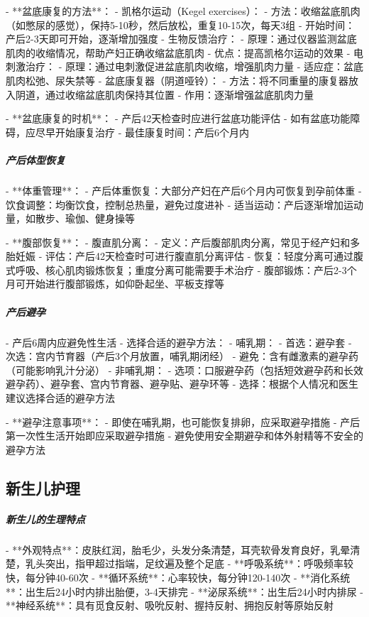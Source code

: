 \begin{enumerate}
- **盆底康复的方法**：
  - 凯格尔运动（Kegel exercises）：
    - 方法：收缩盆底肌肉（如憋尿的感觉），保持5-10秒，然后放松，重复10-15次，每天3组
    - 开始时间：产后2-3天即可开始，逐渐增加强度
  - 生物反馈治疗：
    - 原理：通过仪器监测盆底肌肉的收缩情况，帮助产妇正确收缩盆底肌肉
    - 优点：提高凯格尔运动的效果
  - 电刺激治疗：
    - 原理：通过电刺激促进盆底肌肉收缩，增强肌肉力量
    - 适应症：盆底肌肉松弛、尿失禁等
  - 盆底康复器（阴道哑铃）：
    - 方法：将不同重量的康复器放入阴道，通过收缩盆底肌肉保持其位置
    - 作用：逐渐增强盆底肌肉力量

- **盆底康复的时机**：
  - 产后42天检查时应进行盆底功能评估
  - 如有盆底功能障碍，应尽早开始康复治疗
  - 最佳康复时间：产后6个月内

\subparagraph{产后体型恢复}

- **体重管理**：
  - 产后体重恢复：大部分产妇在产后6个月内可恢复到孕前体重
  - 饮食调整：均衡饮食，控制总热量，避免过度进补
  - 适当运动：产后逐渐增加运动量，如散步、瑜伽、健身操等

- **腹部恢复**：
  - 腹直肌分离：
    - 定义：产后腹部肌肉分离，常见于经产妇和多胎妊娠
    - 评估：产后42天检查时可进行腹直肌分离评估
    - 恢复：轻度分离可通过腹式呼吸、核心肌肉锻炼恢复；重度分离可能需要手术治疗
  - 腹部锻炼：产后2-3个月可开始进行腹部锻炼，如仰卧起坐、平板支撑等

\subparagraph{产后避孕}

- 产后6周内应避免性生活
- 选择合适的避孕方法：
  - 哺乳期：
    - 首选：避孕套
    - 次选：宫内节育器（产后3个月放置，哺乳期闭经）
    - 避免：含有雌激素的避孕药（可能影响乳汁分泌）
  - 非哺乳期：
    - 选项：口服避孕药（包括短效避孕药和长效避孕药）、避孕套、宫内节育器、避孕贴、避孕环等
    - 选择：根据个人情况和医生建议选择合适的避孕方法

- **避孕注意事项**：
  - 即使在哺乳期，也可能恢复排卵，应采取避孕措施
  - 产后第一次性生活开始即应采取避孕措施
  - 避免使用安全期避孕和体外射精等不安全的避孕方法

\subsection{新生儿护理}

\subparagraph{新生儿的生理特点}

- **外观特点**：皮肤红润，胎毛少，头发分条清楚，耳壳软骨发育良好，乳晕清楚，乳头突出，指甲超过指端，足纹遍及整个足底
- **呼吸系统**：呼吸频率较快，每分钟40-60次
- **循环系统**：心率较快，每分钟120-140次
- **消化系统**：出生后24小时内排出胎便，3-4天排完
- **泌尿系统**：出生后24小时内排尿
- **神经系统**：具有觅食反射、吸吮反射、握持反射、拥抱反射等原始反射


\end{enumerate}
